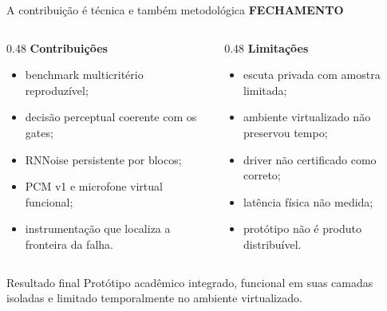 \documentclass[aspectratio=169,10pt]{beamer}
\newcommand{\kicker}[1]{%
    {\color{signalorange}\scriptsize\bfseries\MakeUppercase{#1}}\par\vspace{0.08cm}
}
\begin{document}
\begin{frame}{A contribuição é técnica e também metodológica}
    \kicker{Fechamento}
    \begin{columns}[T,onlytextwidth]
        \begin{column}{0.48\textwidth}
            \textbf{Contribuições}
            \begin{itemize}
                \item benchmark multicritério reproduzível;
                \item decisão perceptual coerente com os gates;
                \item RNNoise persistente por blocos;
                \item PCM v1 e microfone virtual funcional;
                \item instrumentação que localiza a fronteira da falha.
            \end{itemize}
        \end{column}
        \begin{column}{0.48\textwidth}
            \textbf{Limitações}
            \begin{itemize}
                \item escuta privada com amostra limitada;
                \item ambiente virtualizado não preservou tempo;
                \item driver não certificado como correto;
                \item latência física não medida;
                \item protótipo não é produto distribuível.
            \end{itemize}
        \end{column}
    \end{columns}

    \vspace{0.25cm}
    \begin{block}{Resultado final}
        Protótipo acadêmico integrado, funcional em suas camadas isoladas e
        limitado temporalmente no ambiente virtualizado.
    \end{block}
\end{frame}
\end{document}
